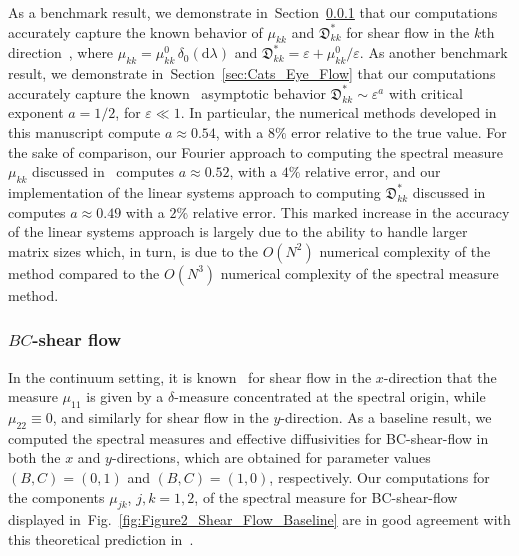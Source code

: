 \documentclass[english,12pt,jmp,graphicx]{revtex4-1}
\newcommand{\secref}[1]{Section~\ref{#1}}
\newcommand{\figref}[1]{Fig.~\ref{#1}}
\newcommand{\Dg}{\mathfrak{D}}
\renewcommand{\d}{\mathrm{d}}
\begin{document}
As a benchmark result, we demonstrate in~\secref{sec:BC_Shear_Flow}
that our computations accurately capture the known behavior of
$\mu_{kk}$ and $\Dg_{kk}^*$ for shear
flow in the $k$th direction~\cite{Avellaneda:CMP-339}, where
$\mu_{kk}=\mu_{kk}^0\,\delta_0(\d\lambda)$ and
$\Dg_{kk}^*=\varepsilon+\mu_{kk}^0/\varepsilon$. As another benchmark result, we
demonstrate in~\secref{sec:Cats_Eye_Flow} that our computations
accurately capture the
known~\cite{Fannjiang:1994:SIAM_JAM:333,Fannjiang:1997:1033}
asymptotic behavior 
$\Dg_{kk}^*\sim\varepsilon^a$ with critical exponent $a=1/2$, for
$\varepsilon\ll1$. In particular, the numerical methods developed in
this manuscript 
compute $a\approx0.54$, with a $8\%$ error relative to the true
value. For the sake of comparison, our Fourier approach to computing
the spectral measure $\mu_{kk}$ discussed in~\cite{Murphy:ADSTPF-2017}
computes $a\approx0.52$, with a $4\%$ relative error, and our
implementation of the linear systems approach to computing $\Dg_{kk}^*$
discussed in~\cite{Pavliotis:PHD_Thesis} computes $a\approx0.49$ with a
$2\%$ relative error. This marked increase in the accuracy of the linear
systems approach is largely due to the ability to handle larger matrix
sizes which, in turn, is due to the $O(N^2)$ numerical complexity of
the method compared to the $O(N^3)$ numerical complexity of the
spectral measure method. 
   

   







\subsubsection{$BC$-shear flow}\label{sec:BC_Shear_Flow}
%
In the continuum setting, it is known~\cite{Avellaneda:CMP-339} for
shear flow in the $x$-direction that the measure $\mu_{11}$ is given by 
a $\delta$-measure concentrated at the spectral origin, while
$\mu_{22}\equiv0$, and similarly for shear flow in the $y$-direction.
As a baseline result, we computed the spectral measures and effective
diffusivities for BC-shear-flow in both the $x$ and $y$-directions,
which are obtained for parameter values $(B,C)=(0,1)$ and
$(B,C)=(1,0)$, respectively. Our computations for the components
$\mu_{jk}$, $j,k=1,2$, of the spectral measure for BC-shear-flow 
displayed in~\figref{fig:Figure2_Shear_Flow_Baseline} are in good agreement
with this theoretical prediction in~\cite{Avellaneda:CMP-339}. 
\end{document}
